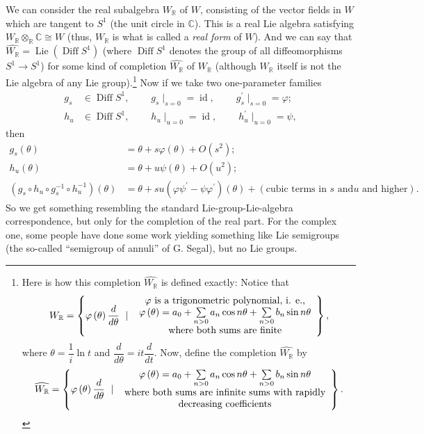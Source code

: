 \documentclass[etingof-lie.tex]{subfiles}
\begin{document}
We can consider the real subalgebra $W_{\mathbb{R}}$ of $W$, consisting of the
vector fields in $W$ which are tangent to $S^{1}$ (the unit circle in
$\mathbb{C}$). This is a real Lie algebra satisfying $W_{\mathbb{R}}%
\otimes_{\mathbb{R}}\mathbb{C}\cong W$ (thus, $W_{\mathbb{R}}$ is what is
called a \textit{real form} of $W$). And we can say that
$\widehat{W_{\mathbb{R}}}=\operatorname*{Lie}\left(  \operatorname*{Diff}%
S^{1}\right)  $ (where $\operatorname*{Diff}S^{1}$ denotes the group of all
diffeomorphisms $S^{1}\rightarrow S^{1}$) for some kind of completion
$\widehat{W_{\mathbb{R}}}$ of $W_{\mathbb{R}}$ (although $W_{\mathbb{R}}$
itself is not the Lie algebra of any Lie group).\footnote{Here is how this
completion $\widehat{W_{\mathbb{R}}}$ is defined exactly: Notice that%
\[
W_{\mathbb{R}}=\left\{  \varphi\left(  \theta\right)  \dfrac{d}{d\theta}%
\ \mid\
\begin{array}
[c]{c}%
\varphi\text{ is a trigonometric polynomial, i. e.,}\\
\varphi\left(  \theta\right)  =a_{0}+\sum\limits_{n>0}a_{n}\cos n\theta
+\sum\limits_{n>0}b_{n}\sin n\theta\\
\text{where both sums are finite}%
\end{array}
\right\}  ,
\]
where $\theta=\dfrac{1}{i}\ln t$ and $\dfrac{d}{d\theta}=it\dfrac{d}{dt}$.
Now, define the completion $\widehat{W_{\mathbb{R}}}$ by%
\[
\widehat{W_{\mathbb{R}}}=\left\{  \varphi\left(  \theta\right)  \dfrac
{d}{d\theta}\ \mid\
\begin{array}
[c]{c}%
\varphi\left(  \theta\right)  =a_{0}+\sum\limits_{n>0}a_{n}\cos n\theta
+\sum\limits_{n>0}b_{n}\sin n\theta\\
\text{where both sums are infinite sums with rapidly}\\
\text{decreasing coefficients}%
\end{array}
\right\}  .
\]
} Now if we take two one-parameter families%
\begin{align*}
g_{s}  &  \in\operatorname*{Diff}S^{1},\ \ \ \ \ \ \ \ \ \ g_{s}\mid
_{s=0}=\operatorname*{id},\ \ \ \ \ \ \ \ \ \ g_{s}^{\prime}\mid_{s=0}%
=\varphi;\\
h_{u}  &  \in\operatorname*{Diff}S^{1},\ \ \ \ \ \ \ \ \ \ h_{u}\mid
_{u=0}=\operatorname*{id},\ \ \ \ \ \ \ \ \ \ h_{u}^{\prime}\mid_{u=0}=\psi,
\end{align*}
then%
\begin{align*}
g_{s}\left(  \theta\right)   &  =\theta+s\varphi\left(  \theta\right)
+O\left(  s^{2}\right)  ;\\
h_{u}\left(  \theta\right)   &  =\theta+u\psi\left(  \theta\right)  +O\left(
u^{2}\right)  ;\\
\left(  g_{s}\circ h_{u}\circ g_{s}^{-1}\circ h_{u}^{-1}\right)  \left(
\theta\right)   &  =\theta+su\left(  \varphi\psi^{\prime}-\psi\varphi^{\prime
}\right)  \left(  \theta\right)  +\left(  \text{cubic terms in }s\text{ and
}u\text{ and higher}\right)  .
\end{align*}
So we get something resembling the standard Lie-group-Lie-algebra
correspondence, but only for the completion of the real part. For the complex
one, some people have done some work yielding something like Lie semigroups
(the so-called ``semigroup of annuli'' of G. Segal), but no Lie groups.
\end{document}
